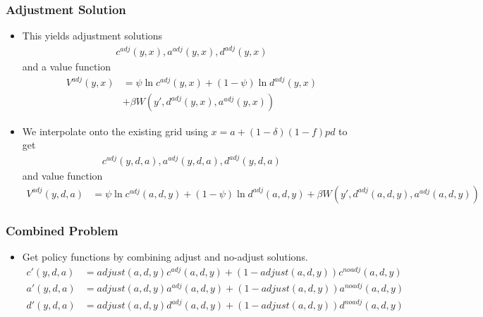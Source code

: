 \documentclass[english,xcolor=svgnames]{beamer}
\begin{document}
\begin{frame}
    \frametitle{Adjustment Solution}
    \begin{itemize}
        \item This yields adjustment solutions
        \begin{align*}
            c^{adj}(y,x), a^{adj}(y,x), d^{adj}(y,x)
        \end{align*}
        and a value function
        \begin{align*}
            V^{adj}(y,x) &= \psi \ln c^{adj}(y,x) +(1-\psi) \ln d^{adj}(y,x) \\
            &+ \beta W(y',d^{adj}(y,x),a^{adj}(y,x)) 
        \end{align*}
        \item We interpolate onto the existing grid using $x=a+(1-\delta)(1-f)pd$ to get
        \begin{align*}
            c^{adj}(y,d,a), a^{adj}(y,d,a), d^{adj}(y,d,a)
        \end{align*}
        and value function
        \begin{align*}
            V^{adj}(y,d,a) &= \psi \ln c^{adj}(a,d,y) +(1-\psi) \ln d^{adj}(a,d,y) + \beta W(y',d^{adj}(a,d,y),a^{adj}(a,d,y)) 
        \end{align*}
    \end{itemize}
\end{frame}



\begin{frame}
    \frametitle{Combined Problem}
    \begin{itemize}
        \item Get policy functions by combining adjust and no-adjust solutions.
        \begin{align*}
            c'(y,d,a) &= adjust(a,d,y)c^{adj}(a,d,y) + (1-adjust(a,d,y))c^{noadj}(a,d,y) \\
            a'(y,d,a) &= adjust(a,d,y)a^{adj}(a,d,y) + (1-adjust(a,d,y))a^{noadj}(a,d,y) \\
            d'(y,d,a) &= adjust(a,d,y)d^{adj}(a,d,y) + (1-adjust(a,d,y))d^{noadj}(a,d,y) 
        \end{align*}
    \end{itemize}
\end{frame}
        
\end{document}
